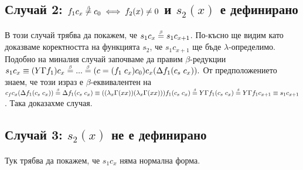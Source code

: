 \documentclass[12pt]{article}
\begin{document}
\subsection*{Случай 2: $f_1 c_x \not\betaeq c_0 \iff f_2(x) \neq 0$ и $s_2(x)$ е дефинирано}
\paragraph*{}
В този случай трябва да покажем, че $s_1 c_x \betaeq s_1 c_{x+1}$. По-късно ще видим като доказваме коректността на функцията $s_2$, че $s_1 c_{x+1}$ ще бъде $\lambda$-определимо. Подобно на миналия случай започваме да правим $\beta$-редукции $s_1 c_x \equiv (Y \Gamma f_1) c_x \betaeq ... \betaeq (c= (f_1 \; c_x) c_0) c_x (\Delta f_1 (c_s \; c_x)).$ От предположението знаем, че този израз е $\beta$-еквивалентен на $c_f c_x (\Delta f_1 (c_s \; c_x)) \betaeq \Delta f_1 (c_s \; c_x) \equiv ((\lambda_x \Gamma(xx))(\lambda_x \Gamma(xx))) f_1 (c_s \; c_x) \betaeq Y \Gamma f_1 (c_s \; c_x) \betaeq Y \Gamma f_1 c_{x+1} \equiv s_1 c_{x+1}$. Така доказахме случая.

\subsection*{Случай 3:  $s_2(x)$ не е дефинирано}
\paragraph*{}
Тук трябва да покажем, че $s_1 c_{x}$ няма нормална форма. 
\end{document}
